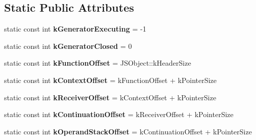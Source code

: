 \subsection*{Static Public Attributes}
\begin{DoxyCompactItemize}
\item 
\hypertarget{classv8_1_1internal_1_1_j_s_generator_object_a3b515123f771dc8d61065ded67f7f1f9}{}static const int {\bfseries k\+Generator\+Executing} = -\/1\label{classv8_1_1internal_1_1_j_s_generator_object_a3b515123f771dc8d61065ded67f7f1f9}

\item 
\hypertarget{classv8_1_1internal_1_1_j_s_generator_object_a305bc269946a338f1232f4268392fa05}{}static const int {\bfseries k\+Generator\+Closed} = 0\label{classv8_1_1internal_1_1_j_s_generator_object_a305bc269946a338f1232f4268392fa05}

\item 
\hypertarget{classv8_1_1internal_1_1_j_s_generator_object_a2a98d0be0311407edc54535904231140}{}static const int {\bfseries k\+Function\+Offset} = J\+S\+Object\+::k\+Header\+Size\label{classv8_1_1internal_1_1_j_s_generator_object_a2a98d0be0311407edc54535904231140}

\item 
\hypertarget{classv8_1_1internal_1_1_j_s_generator_object_ac019c55d4dbe5d8b914bb4d1741ca3a6}{}static const int {\bfseries k\+Context\+Offset} = k\+Function\+Offset + k\+Pointer\+Size\label{classv8_1_1internal_1_1_j_s_generator_object_ac019c55d4dbe5d8b914bb4d1741ca3a6}

\item 
\hypertarget{classv8_1_1internal_1_1_j_s_generator_object_abb28d5ab4f831bba6511c375521df70b}{}static const int {\bfseries k\+Receiver\+Offset} = k\+Context\+Offset + k\+Pointer\+Size\label{classv8_1_1internal_1_1_j_s_generator_object_abb28d5ab4f831bba6511c375521df70b}

\item 
\hypertarget{classv8_1_1internal_1_1_j_s_generator_object_afd60e4d60df80acbd854079dbbb862d2}{}static const int {\bfseries k\+Continuation\+Offset} = k\+Receiver\+Offset + k\+Pointer\+Size\label{classv8_1_1internal_1_1_j_s_generator_object_afd60e4d60df80acbd854079dbbb862d2}

\item 
\hypertarget{classv8_1_1internal_1_1_j_s_generator_object_a58f03f9140bfd0d328c8caa4f4e32ba5}{}static const int {\bfseries k\+Operand\+Stack\+Offset} = k\+Continuation\+Offset + k\+Pointer\+Size\label{classv8_1_1internal_1_1_j_s_generator_object_a58f03f9140bfd0d328c8caa4f4e32ba5}


\end{DoxyCompactItemize}
